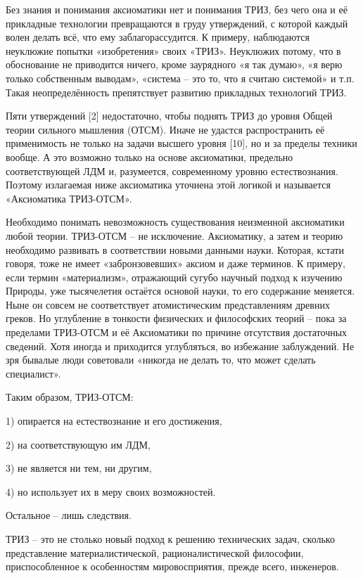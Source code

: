 \documentclass[11pt,a4paper]{article}
\begin{document}
Без знания и понимания аксиоматики нет и понимания ТРИЗ, без чего она и её прикладные технологии превращаются в груду утверждений, с которой каждый волен делать всё, что ему заблагорассудится. К примеру, наблюдаются неуклюжие попытки «изобретения» своих «ТРИЗ». Неуклюжих потому, что в обоснование не приводится ничего, кроме заурядного «я так думаю», «я верю только собственным выводам», «система – это то, что я считаю системой» и т.п. Такая неопределённость препятствует развитию прикладных технологий ТРИЗ.

Пяти утверждений [2] недостаточно, чтобы поднять ТРИЗ до уровня Общей теории сильного мышления (ОТСМ). Иначе не удастся распространить её применимость не только на задачи высшего уровня [10], но и за пределы техники вообще. А это возможно только на основе аксиоматики, предельно соответствующей ЛДМ и, разумеется, современному уровню естествознания. Поэтому излагаемая ниже аксиоматика уточнена этой логикой и называется «Аксиоматика ТРИЗ-ОТСМ».

Необходимо понимать невозможность существования неизменной аксиоматики любой теории. ТРИЗ-ОТСМ – не исключение. Аксиоматику, а затем и теорию необходимо развивать в соответствии новыми данными науки. Которая, кстати говоря, тоже не имеет «забронзовевших» аксиом и даже терминов. К примеру, если термин «материализм», отражающий сугубо научный подход к изучению Природы, уже тысячелетия остаётся основой науки, то его содержание меняется. Ныне он совсем не соответствует атомистическим представлениям древних греков. Но углубление в тонкости физических и философских теорий – пока за пределами ТРИЗ-ОТСМ и её Аксиоматики по причине отсутствия достаточных сведений. Хотя иногда и приходится углубляться, во избежание заблуждений. Не зря бывалые люди советовали «никогда не делать то, что может сделать специалист».

Таким образом, ТРИЗ-ОТСМ:

1) опирается на естествознание и его достижения,

2) на соответствующую им ЛДМ,

3) не является ни тем, ни другим,

4) но использует их в меру своих возможностей.

Остальное – лишь следствия.

ТРИЗ – это не столько новый подход к решению технических задач, сколько представление материалистической, рационалистической философии, приспособленное к особенностям мировосприятия, прежде всего, инженеров.
\end{document}
